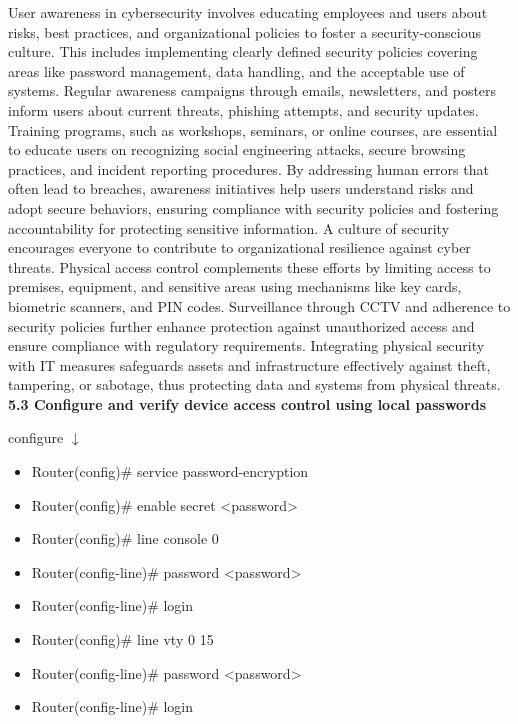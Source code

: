 \documentclass{article}
\begin{document}
	User awareness in cybersecurity involves educating employees and users about risks, best practices, and organizational policies to foster a security-conscious culture. This includes implementing clearly defined security policies covering areas like password management, data handling, and the acceptable use of systems. Regular awareness campaigns through emails, newsletters, and posters inform users about current threats, phishing attempts, and security updates. Training programs, such as workshops, seminars, or online courses, are essential to educate users on recognizing social engineering attacks, secure browsing practices, and incident reporting procedures. By addressing human errors that often lead to breaches, awareness initiatives help users understand risks and adopt secure behaviors, ensuring compliance with security policies and fostering accountability for protecting sensitive information. A culture of security encourages everyone to contribute to organizational resilience against cyber threats. Physical access control complements these efforts by limiting access to premises, equipment, and sensitive areas using mechanisms like key cards, biometric scanners, and PIN codes. Surveillance through CCTV and adherence to security policies further enhance protection against unauthorized access and ensure compliance with regulatory requirements. Integrating physical security with IT measures safeguards assets and infrastructure effectively against theft, tampering, or sabotage, thus protecting data and systems from physical threats.\\
  
\noindent\textbf{5.3 Configure and verify device access control using local passwords}

configure $\downarrow$
\begin{itemize}
\item Router(config)\# service password-encryption
\item Router(config)\# enable secret \textless password\textgreater
\item Router(config)\# line console 0
\item Router(config-line)\# password \textless password\textgreater
\item Router(config-line)\# login
\item Router(config)\# line vty 0 15
\item Router(config-line)\# password \textless password\textgreater
\item Router(config-line)\# login
\end{itemize}
		
\end{document}
